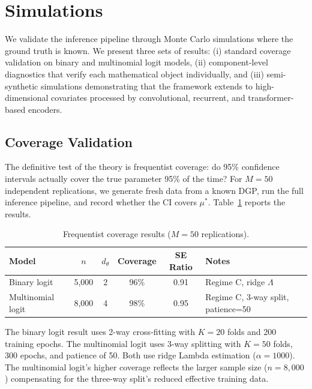 \section{Simulations}\label{sec:simulations}

We validate the inference pipeline through Monte Carlo simulations where the ground truth is known. We present three sets of results: (i) standard coverage validation on binary and multinomial logit models, (ii) component-level diagnostics that verify each mathematical object individually, and (iii) semi-synthetic simulations demonstrating that the framework extends to high-dimensional covariates processed by convolutional, recurrent, and transformer-based encoders.

\subsection{Coverage Validation}\label{sec:sim_coverage}

The definitive test of the \citet{farrell2021deep, farrell2025deep} theory is frequentist coverage: do 95\% confidence intervals actually cover the true parameter 95\% of the time? For $M = 50$ independent replications, we generate fresh data from a known DGP, run the full inference pipeline, and record whether the CI covers $\mu^*$. Table~\ref{tab:coverage_results} reports the results.

\begin{table}[ht]
\centering
\caption{Frequentist coverage results ($M=50$ replications).}\label{tab:coverage_results}
\begin{tabular}{lccccl}
\toprule
\textbf{Model} & $n$ & $d_\theta$ & \textbf{Coverage} & \textbf{SE Ratio} & \textbf{Notes} \\
\midrule
Binary logit      & 5,000  & 2 & 96\% & 0.91 & Regime C, ridge $\Lambda$ \\
Multinomial logit & 8,000  & 4 & 98\% & 0.95 & Regime C, 3-way split, patience=50 \\
\bottomrule
\end{tabular}
\end{table}

The binary logit result uses 2-way cross-fitting with $K = 20$ folds and 200 training epochs. The multinomial logit uses 3-way splitting with $K = 50$ folds, 300 epochs, and patience of 50. Both use ridge Lambda estimation ($\alpha = 1000$). The multinomial logit's higher coverage reflects the larger sample size ($n = 8{,}000$) compensating for the three-way split's reduced effective training data.

